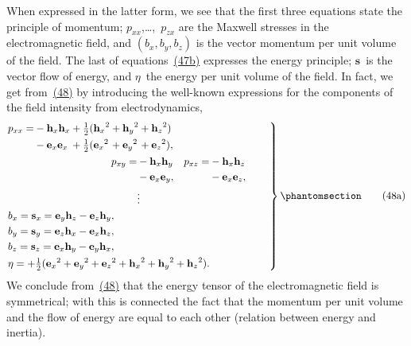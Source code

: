 \documentclass[12pt]{book}[2005/09/16]
\newcommand{\Change}[2]{#2}
\newcommand{\Add}[1]{\Change{}{#1}}
\newcommand{\PageSep}[1]{\ignorespaces}
\newcommand{\Tag}[1]{%
  \phantomsection
  \label{eqn:#1}
  \tag*{#1}
}
\newcommand{\Eqref}[1]{\hyperref[eqn:#1]{#1}}
\newcommand{\Vector}[1]{\mathbf{#1}}
\newcommand{\e}{\Vector{e}}
\newcommand{\h}{\Vector{h}}
\newcommand{\s}{\Vector{s}}
\begin{document}
When expressed in the latter form, we see that the
first three equations state the principle of momentum;
$p_{xx}$\Add{,}\ldots\Add{,}~$p_{zx}$ are the Maxwell stresses in the electromagnetic
field, and $(b_{x}, b_{y}, b_{z})$ is the vector momentum
per unit volume of the field. The last of equations~\Eqref{(47b)}
expresses the energy principle; $\s$~is the vector flow of
energy, and $\eta$~the energy per unit volume of the field.
In fact, we get from~\Eqref{(48)} by introducing the well-known
expressions for the components of the field intensity from
electrodynamics,
\PageSep{54}
\[
\left.
\begin{aligned}
&\begin{alignedat}{4}
p_{xx} = &{} - \h_{x} \h_{x}
  &&+ \tfrac{1}{2}({\h_{x}}^{2} &&+ {\h_{y}}^{2} &&+ {\h_{z}}^{2}) \\
        &{} - \e_{x} \e_{\Change{y}{x}}
  &&+ \tfrac{1}{2}({\e_{x}}^{2} &&+ {\e_{y}}^{2} &&+ {\e_{z}}^{2})\Add{,}
\end{alignedat} \\
%
&\qquad\qquad\qquad\qquad\qquad
\begin{alignedat}{3}
p_{xy} = &{} - \h_{x} \h_{y}\quad
       && p_{xz} = && {} - \h_{x} \h_{z} \\
        &{} - \e_{x} \e_{y}\Add{,}\quad
       &&  && {} - \e_{x} \e_{z}\Add{,}
\end{alignedat} \\
%
& \makebox[3.5in][c]{$\vdots$} \\
&b_{x} = \s_{x} = \e_{y}\h_{z} - \e_{z}\h_{y}\Add{,} \\
&b_{y} = \s_{y} = \e_{z}\h_{x} - \e_{x}\h_{z}\Add{,} \\
&b_{z} = \s_{z} = \e_{x}\h_{y} - \e_{y}\h_{x}\Add{,} \\
%
&\eta = +\tfrac{1}{2}({\e_{x}}^{2} + {\e_{y}}^{2} + {\e_{z}}^{2}
  + {\h_{x}}^{2} + {\h_{y}}^{2} + {\h_{z}}^{2})\Add{.}
\end{aligned}
\right\}
\Tag{(48a)}
\]
We conclude from~\Eqref{(48)} that the energy tensor of the
electromagnetic field is symmetrical; with this is connected
the fact that the momentum per unit volume and
the flow of energy are equal to each other (relation
between energy and inertia).
\end{document}
